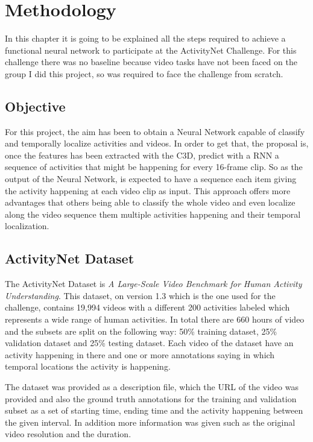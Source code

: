 \chapter{Methodology}

In this chapter it is going to be explained all the steps required to achieve a functional neural network to participate at the ActivityNet Challenge. For this challenge there was no baseline because video tasks have not been faced on the group I did this project, so was required to face the challenge from scratch.

\section{Objective}

For this project, the aim has been to obtain a Neural Network capable of classify and temporally localize activities and videos. In order to get that, the proposal is, once the features has been extracted with the C3D, predict with a RNN a sequence of activities that might be happening for every 16-frame clip. So as the output of the Neural Network, is expected to have a sequence each item giving the activity happening at each video clip as input. This approach offers more advantages that others being able to classify the whole video and even localize along the video sequence them multiple activities happening and their temporal localization.

\section{ActivityNet Dataset}

The ActivityNet Dataset\cite{caba2015activitynet} is \textit{A Large-Scale Video Benchmark for
Human Activity Understanding}. This dataset, on version 1.3 which is the one used for the challenge, contains 19,994 videos with a different 200 activities labeled which represents a wide range of human activities. In total there are 660 hours of video and the subsets are split on the following way: 50\% training dataset, 25\% validation dataset and 25\% testing dataset. Each video of the dataset have an activity happening in there and one or more annotations saying in which temporal locations the activity is happening.

The dataset was provided as a description file, which the URL of the video was provided and also the ground truth annotations for the training and validation subset as a set of starting time, ending time and the activity happening between the given interval. In addition more information was given such as the original video resolution and the duration.

